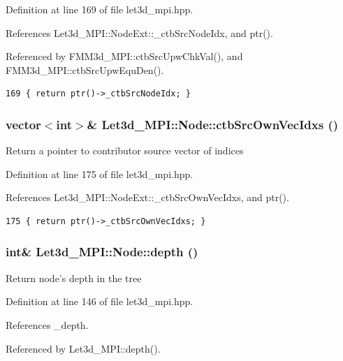 Definition at line 169 of file let3d\_\-mpi.hpp.

References Let3d\_\-MPI::Node\-Ext::\_\-ctb\-Src\-Node\-Idx, and ptr().

Referenced by FMM3d\_\-MPI::ctb\-Src\-Upw\-Chk\-Val(), and FMM3d\_\-MPI::ctb\-Src\-Upw\-Equ\-Den().

\footnotesize\begin{verbatim}169 { return ptr()->_ctbSrcNodeIdx; }
\end{verbatim}\normalsize 


\subsubsection{\setlength{\rightskip}{0pt plus 5cm}vector$<$int$>$\& Let3d\_\-MPI::Node::ctb\-Src\-Own\-Vec\-Idxs ()\hspace{0.3cm}{\tt  [inline]}}\label{classLet3d__MPI_1_1Node_9410a66c677d88478f7a7a341fd9d946_9410a66c677d88478f7a7a341fd9d946}


Return a pointer to contributor source vector of indices 

Definition at line 175 of file let3d\_\-mpi.hpp.

References Let3d\_\-MPI::Node\-Ext::\_\-ctb\-Src\-Own\-Vec\-Idxs, and ptr().

\footnotesize\begin{verbatim}175 { return ptr()->_ctbSrcOwnVecIdxs; }
\end{verbatim}\normalsize 


\subsubsection{\setlength{\rightskip}{0pt plus 5cm}int\& Let3d\_\-MPI::Node::depth ()\hspace{0.3cm}{\tt  [inline]}}\label{classLet3d__MPI_1_1Node_9a89dd5621b9f31341c798c701590c20_9a89dd5621b9f31341c798c701590c20}


Return node's depth in the tree 

Definition at line 146 of file let3d\_\-mpi.hpp.

References \_\-depth.

Referenced by Let3d\_\-MPI::depth().

